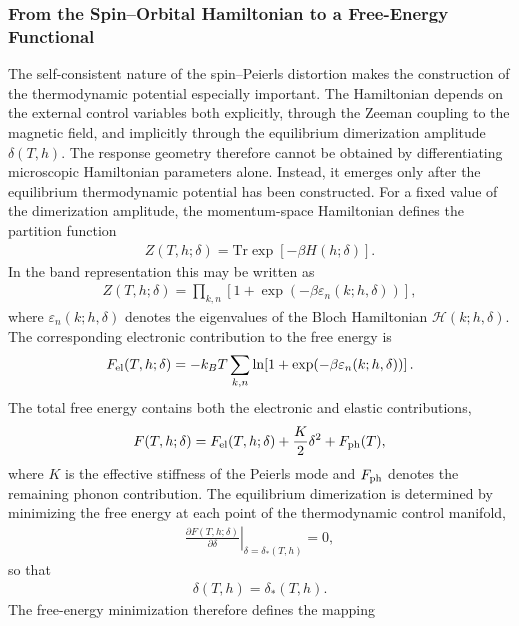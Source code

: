 \subsubsection{From the Spin--Orbital Hamiltonian to a Free-Energy Functional}
The self-consistent nature of the spin--Peierls distortion makes
the construction of the thermodynamic potential especially
important. The Hamiltonian depends on the external control
variables both explicitly, through the Zeeman coupling to the
magnetic field, and implicitly through the equilibrium
dimerization amplitude \(\delta(T,h)\). The response geometry
therefore cannot be obtained by differentiating microscopic
Hamiltonian parameters alone. Instead, it emerges only after the
equilibrium thermodynamic potential has been constructed.
For a fixed value of the dimerization amplitude, the
momentum-space Hamiltonian defines the partition function
\begin{align}
Z(T,h;\delta)
=
\mathrm{Tr}
\exp\!\left[
-\beta H(h;\delta)
\right].
\end{align}
In the band representation this may be written as
\begin{align}
Z(T,h;\delta)
=
\prod_{k,n}
\left[
1+
\exp\!\left(
-\beta\varepsilon_n(k;h,\delta)
\right)
\right],
\end{align}
where \(\varepsilon_n(k;h,\delta)\) denotes the eigenvalues of
the Bloch Hamiltonian
\(\mathcal{H}(k;h,\delta)\).
The corresponding electronic contribution to the free energy is
\begin{align}
F_{\rm el}(T,h;\delta)
=
-k_BT
\sum_{k,n}
\ln\!\left[
1+
\exp\!\left(
-\beta\varepsilon_n(k;h,\delta)
\right)
\right].
\end{align}
The total free energy contains both the electronic and elastic
contributions,
\begin{align}
F(T,h;\delta)
=
F_{\rm el}(T,h;\delta)
+
\frac{K}{2}\delta^2
+
F_{\rm ph}(T),
\end{align}
where \(K\) is the effective stiffness of the Peierls mode and
\(F_{\rm ph}\) denotes the remaining phonon contribution.
The equilibrium dimerization is determined by minimizing the
free energy at each point of the thermodynamic control manifold,
\begin{align}
\left.
\frac{\partial F(T,h;\delta)}
{\partial\delta}
\right|_{\delta=\delta_\ast(T,h)}
=
0,
\end{align}
so that
\begin{align}
\delta(T,h)
=
\delta_\ast(T,h).
\end{align}
The free-energy minimization therefore defines the mapping
